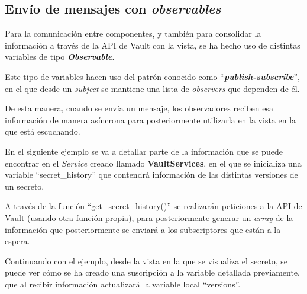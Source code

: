 \documentclass{\ClassPath/viu-tfm-template}
\begin{document}
\subsection{Envío de mensajes con \textit{observables}}

Para la comunicación entre componentes, y también para consolidar la información a través de la API de Vault con la vista, se ha hecho uso de distintas variables de tipo \textbf{\textit{Observable}}.

Este tipo de variables hacen uso del patrón conocido como “\textit{\textbf{publish-subscribe}}”, en el que desde un \textit{subject} se mantiene una lista de \textit{observers} que dependen de él.

De esta manera, cuando se envía un mensaje, los observadores reciben esa información de manera asíncrona para posteriormente utilizarla en la vista en la que está escuchando.

En el siguiente ejemplo se va a detallar parte de la información que se puede encontrar en el \textit{Service} creado llamado \textbf{VaultServices}, en el que se inicializa una variable “secret\_history” que contendrá información de las distintas versiones de un secreto.

A través de la función “get\_secret\_history()” se realizarán peticiones a la API de Vault (usando otra función propia), para posteriormente generar un \textit{array} de la información que posteriormente se enviará a los subscriptores que están a la espera.


Continuando con el ejemplo, desde la vista en la que se visualiza el secreto, se puede ver cómo se ha creado una suscripción a la variable detallada previamente, que al recibir información actualizará la variable local “versions”.
\end{document}
